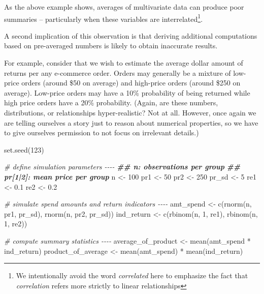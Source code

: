 \documentclass[
]{krantz}
\makeatletter
\newenvironment{Shaded}{\begin{snugshade}}{\end{snugshade}}
\newcommand{\CommentTok}[1]{\textcolor[rgb]{0.37,0.37,0.37}{\textit{#1}}}
\newcommand{\DecValTok}[1]{\textcolor[rgb]{0.06,0.06,0.06}{#1}}
\newcommand{\DocumentationTok}[1]{\textcolor[rgb]{0.37,0.37,0.37}{\textbf{\textit{#1}}}}
\newcommand{\FloatTok}[1]{\textcolor[rgb]{0.06,0.06,0.06}{#1}}
\newcommand{\FunctionTok}[1]{\textcolor[rgb]{0,0,0}{#1}}
\newcommand{\NormalTok}[1]{#1}
\newcommand{\OtherTok}[1]{\textcolor[rgb]{0.37,0.37,0.37}{#1}}
\newcommand{\SpecialCharTok}[1]{\textcolor[rgb]{0,0,0}{#1}}
\newenvironment{kframe}{%
\medskip{}
\setlength{\fboxsep}{.8em}
 \def\at@end@of@kframe{}%
 \ifinner\ifhmode%
  \def\at@end@of@kframe{\end{minipage}}%
  \begin{minipage}{\columnwidth}%
 \fi\fi%
 \def\FrameCommand##1{\hskip\@totalleftmargin \hskip-\fboxsep
 \colorbox{shadecolor}{##1}\hskip-\fboxsep
     \hskip-\linewidth \hskip-\@totalleftmargin \hskip\columnwidth}%
 \MakeFramed {\advance\hsize-\width
   \@totalleftmargin\z@ \linewidth\hsize
   \@setminipage}}%
 {\par\unskip\endMakeFramed%
 \at@end@of@kframe}
\renewenvironment{Shaded}{\begin{kframe}}{\end{kframe}}
\makeatother
\begin{document}
As the above example shows, averages of multivariate data can produce poor summaries -- particularly when these variables are interrelated\footnote{We intentionally avoid the word \emph{correlated} here to emphasize the fact that \emph{correlation} refers more strictly to linear relationships}.

A second implication of this observation is that deriving additional computations based on pre-averaged numbers is likely to obtain inaccurate results.

For example, consider that we wish to estimate the average dollar amount of returns per any e-commerce order.
Orders may generally be a mixture of low-price orders (around \$50 on average) and high-price orders (around \$250 on average).
Low-price orders may have a 10\% probability of being returned while high price orders have a 20\% probability.
(Again, are these numbers, distributions, or relationships hyper-realistic?
Not at all.
However, once again we are telling ourselves a story just to reason about numerical properties, so we have to give ourselves permission to not focus on irrelevant details.)

\begin{Shaded}
\begin{Highlighting}[]
\FunctionTok{set.seed}\NormalTok{(}\DecValTok{123}\NormalTok{)}

\CommentTok{\# define simulation parameters {-}{-}{-}{-}}
\DocumentationTok{\#\# n: observations per group}
\DocumentationTok{\#\# pr[1|2]: mean price per group}
\NormalTok{n }\OtherTok{\textless{}{-}} \DecValTok{100}
\NormalTok{pr1 }\OtherTok{\textless{}{-}} \DecValTok{50}
\NormalTok{pr2 }\OtherTok{\textless{}{-}} \DecValTok{250}
\NormalTok{pr\_sd }\OtherTok{\textless{}{-}} \DecValTok{5}
\NormalTok{re1 }\OtherTok{\textless{}{-}} \FloatTok{0.1}
\NormalTok{re2 }\OtherTok{\textless{}{-}} \FloatTok{0.2}

\CommentTok{\# simulate spend amounts and return indicators {-}{-}{-}{-}}
\NormalTok{amt\_spend  }\OtherTok{\textless{}{-}} \FunctionTok{c}\NormalTok{(}\FunctionTok{rnorm}\NormalTok{(n, pr1, pr\_sd), }\FunctionTok{rnorm}\NormalTok{(n, pr2, pr\_sd))}
\NormalTok{ind\_return }\OtherTok{\textless{}{-}} \FunctionTok{c}\NormalTok{(}\FunctionTok{rbinom}\NormalTok{(n, }\DecValTok{1}\NormalTok{, re1),    }\FunctionTok{rbinom}\NormalTok{(n, }\DecValTok{1}\NormalTok{, re2))}

\CommentTok{\# compute summary statistics {-}{-}{-}{-}}
\NormalTok{average\_of\_product }\OtherTok{\textless{}{-}} \FunctionTok{mean}\NormalTok{(amt\_spend }\SpecialCharTok{*}\NormalTok{ ind\_return)}
\NormalTok{product\_of\_average }\OtherTok{\textless{}{-}} \FunctionTok{mean}\NormalTok{(amt\_spend) }\SpecialCharTok{*} \FunctionTok{mean}\NormalTok{(ind\_return)}
\end{Highlighting}
\end{Shaded}
\end{document}
